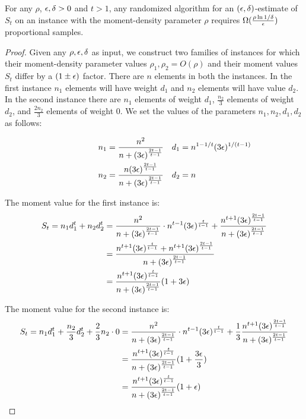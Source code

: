 \begin{thm}\label{thm:char-lower} For any $\rho$, $\epsilon,\delta>0$ and $t>1$, any randomized algorithm for an $(\epsilon,\delta)$-estimate of $S_t$ on an instance with the moment-density parameter $\rho$ requires $\Omega(\frac{\rho \ln 1/\delta}{\epsilon})$ proportional samples. \end{thm}
\begin{proof} 
  Given any $\rho,\epsilon,\delta$ as input, we construct two families of instances for which their moment-density parameter values $\rho_1,\rho_2=O(\rho)$ and their moment values $S_t$ differ by a $(1\pm \epsilon)$ factor. There are $n$ elements in both the instances. In the first instance $n_1$ elements will have weight $d_1$ and $n_2$ elements will have value $d_2$. In the second instance there are $n_1$ elements of weight $d_1$, $\frac{n_2}{3}$ elements of weight $d_2$, and $\frac{2n_2}{3}$ elements of weight $0$. We set the values of the parameters $n_1,n_2,d_1,d_2$ as follows:

\begin{gather}
\begin{align*}
\qquad \qquad \quad n_1 & =  \frac{n^2}{n +(3 \epsilon)^{\frac{2t-1}{t-1}}} & d_1 & =n^{1-1/t}( 3\epsilon)^{1/(t-1)}\\
\qquad \qquad \quad n_2 & =  \frac{n (3\epsilon)^{\frac{2t-1}{t-1}}}{n +(3 \epsilon)^{\frac{2t-1}{t-1}}} & d_2&=n
\end{align*}
\end{gather}

\noindent The moment value for the first instance is:
\begin{align*}
S_t = n_1d_1^t+n_2d_2^t&=\frac{n^2}{n +(3 \epsilon)^{\frac{2t-1}{t-1}}}\cdot n^{t-1}(3\epsilon)^{\frac{t}{t-1}}+\frac{n^{t+1} (3\epsilon)^{\frac{2t-1}{t-1}}}{n +(3 \epsilon)^{\frac{2t-1}{t-1}}} \\
&= \frac{n^{t+1}(3\epsilon)^{\frac{t}{t-1}}+n^{t+1}(3\epsilon)^{\frac{2t-1}{t-1}}}{n +(3 \epsilon)^{\frac{2t-1}{t-1}}}\\
&=\frac{n^{t+1}(3\epsilon)^\frac{t}{t-1}}{n+(3\epsilon)^{\frac{2t-1}{t-1}}}(1+3\epsilon)
\end{align*}

\noindent The moment value for the second instance is:
\begin{align*}
S_t = n_1d_1^t+\frac{n_2}{3}d_2^t+\frac{2}{3}n_2\cdot0 &=\frac{n^2}{n +(3 \epsilon)^{\frac{2t-1}{t-1}}}\cdot n^{t-1}(3\epsilon)^{\frac{t}{t-1}}+\frac{1}{3}\frac{n^{t+1} (3\epsilon)^{\frac{2t-1}{t-1}}}{n +(3 \epsilon)^{\frac{2t-1}{t-1}}}\\
&=\frac{n^{t+1}(3\epsilon)^\frac{t}{t-1}}{n+(3\epsilon)^{\frac{2t-1}{t-1}}}(1+\frac{3\epsilon}{3})\\
&=\frac{n^{t+1}(3\epsilon)^\frac{t}{t-1}}{n+(3\epsilon)^{\frac{2t-1}{t-1}}}(1+\epsilon)
\end{align*}


\end{proof}
